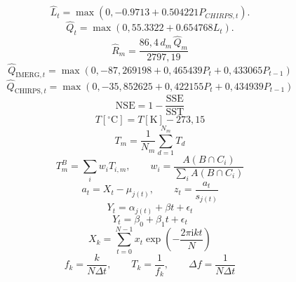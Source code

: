 \documentclass[10pt]{article}
\begin{document}
\newpage
\begin{equation}
\widehat{L}_t=\max\left(0,-0.9713+0.504221P_{CHIRPS,t}\right).\tag{2.12}
\end{equation}
\newpage
\begin{equation}
\widehat{Q}_t=\max\left(0,55.3322+0.654768L_t\right).\tag{2.13}
\end{equation}
\newpage
\begin{equation}
\widehat{R}_m=\frac{86{,}4\,d_m\,\widehat{Q}_m}{2797{,}19}\tag{2.14}
\end{equation}
\newpage
\begin{equation}
\widehat{Q}_{\mathrm{IMERG},t}=\max\!\left(0,-87{,}269198+0{,}465439P_t+0{,}433065P_{t-1}\right)\tag{2.15}
\end{equation}
\newpage
\begin{equation}
\widehat{Q}_{\mathrm{CHIRPS},t}=\max\!\left(0,-35{,}852625+0{,}422155P_t+0{,}434939P_{t-1}\right)\tag{2.16}
\end{equation}
\newpage
\begin{equation}
\mathrm{NSE}=1-\frac{\mathrm{SSE}}{\mathrm{SST}}\tag{2.17}
\end{equation}
\newpage
\begin{equation}
T[{}^\circ\mathrm{C}]=T[\mathrm{K}]-273{,}15\tag{3.1}
\end{equation}
\newpage
\begin{equation}
T_m=\frac{1}{N_m}\sum_{d=1}^{N_m}T_d\tag{3.2}
\end{equation}
\newpage
\begin{equation}
T_m^B=\sum_i w_iT_{i,m},\qquad w_i=\frac{A(B\cap C_i)}{\sum_i A(B\cap C_i)}\tag{3.3}
\end{equation}
\newpage
\begin{equation}
a_t=X_t-\mu_{j(t)},\qquad z_t=\frac{a_t}{s_{j(t)}}\tag{3.4}
\end{equation}
\newpage
\begin{equation}
Y_t=\alpha_{j(t)}+\beta t+\epsilon_t\tag{3.5}
\end{equation}
\newpage
\begin{equation}
Y_t=\beta_0+\beta_1t+\epsilon_t\tag{3.6}
\end{equation}
\newpage
\begin{equation}
X_k=\sum_{t=0}^{N-1}x_t\exp\!\left(-\frac{2\pi\mathrm{i}kt}{N}\right)\tag{4.1}
\end{equation}
\newpage
\begin{equation}
f_k=\frac{k}{N\Delta t},\qquad T_k=\frac{1}{f_k},\qquad\Delta f=\frac{1}{N\Delta t}\tag{4.2}
\end{equation}
\end{document}
